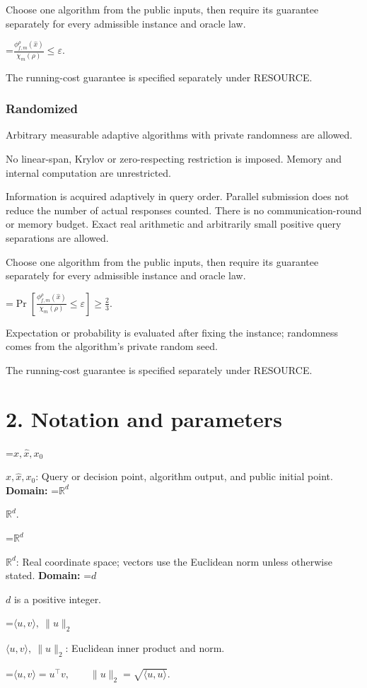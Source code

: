 \documentclass[10pt,a4paper]{article}
\newcommand{\AtlasMath}[1]{\par\begingroup\centering\setbox0=\hbox{$\displaystyle #1$}\ifdim\wd0>1.4\linewidth\typeout{ATLAS WIDE FORMULA: \the\wd0}\fi\ifdim\wd0>\linewidth\resizebox{\linewidth}{!}{\box0}\else\box0\fi\par\endgroup}
\newcommand{\AtlasInlineMath}[1]{\begingroup\setbox0=\hbox{$#1$}\ifdim\wd0>.4\linewidth\endgroup\AtlasMath{#1}\else\endgroup$#1$\fi}
\begin{document}
Choose one algorithm from the public inputs, then require its guarantee separately for every admissible instance and oracle law.


\AtlasMath{\frac{\phi_{f,m}^{\rho}(\widehat{x})}{\chi_m(\rho)}\le \varepsilon.}


The running-cost guarantee is specified separately under RESOURCE.

\subsubsection{Randomized}
Arbitrary measurable adaptive algorithms with private randomness are allowed.

No linear-span, Krylov or zero-respecting restriction is imposed. Memory and internal computation are unrestricted.

Information is acquired adaptively in query order. Parallel submission does not reduce the number of actual responses counted. There is no communication-round or memory budget. Exact real arithmetic and arbitrarily small positive query separations are allowed.

Choose one algorithm from the public inputs, then require its guarantee separately for every admissible instance and oracle law.


\AtlasMath{\Pr\!\left[\frac{\phi_{f,m}^{\rho}(\widehat{x})}{\chi_m(\rho)}\le \varepsilon\right]\ge\frac23.}


Expectation or probability is evaluated after fixing the instance; randomness comes from the algorithm's private random seed.

The running-cost guarantee is specified separately under RESOURCE.

\section{2. Notation and parameters}
\AtlasInlineMath{x,\widehat{x},x_0}: Query or decision point, algorithm output, and public initial point. \textbf{Domain:} \AtlasInlineMath{\mathbb{R}^d}.

\AtlasInlineMath{\mathbb{R}^d}: Real coordinate space; vectors use the Euclidean norm unless otherwise stated. \textbf{Domain:} \AtlasInlineMath{d} is a positive integer.

\AtlasInlineMath{\langle u,v\rangle,\ \|u\|_2}: Euclidean inner product and norm.


\AtlasMath{\langle u,v\rangle=u^\top v,\qquad\|u\|_2=\sqrt{\langle u,u\rangle}.}
\end{document}
